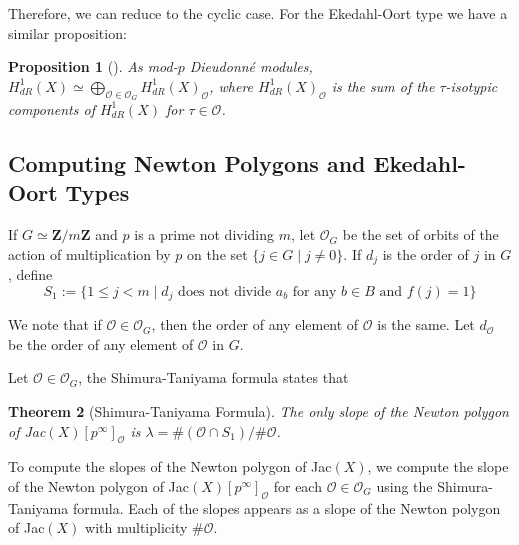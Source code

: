 \documentclass{article}
\newtheorem{theorem}{Theorem}[section]
\newtheorem{proposition}[theorem]{Proposition}
\theoremstyle{remark}
\theoremstyle{definition}
\begin{document}
\par Therefore, we can reduce to the cyclic case. For the Ekedahl-Oort type we have a similar proposition:
\begin{proposition}
    [] As mod-$p$ Dieudonn\'{e} modules, $H^1_{dR}(X) \simeq \bigoplus_{\mathcal{O} \in \mathcal{O}_G} H^1_{dR}(X)_{\mathcal{O}}$, where $H^1_{dR}(X)_{\mathcal{O}}$ is the sum of the $\tau$-isotypic components of $H^1_{dR}(X)$ for $\tau \in \mathcal{O}$.
\end{proposition} 


\subsection{Computing Newton Polygons and Ekedahl-Oort Types}
\par If $G \simeq \mathbf{Z}/m\mathbf{Z}$ and $p$ is a prime not dividing $m$, let $\mathcal{O}_G$ be the set of orbits of the action of multiplication by $p$ on the set $\{j \in G \mid j \neq 0\}$. If $d_j$ is the order of $j$ in $G$, define \[S_1 := \{1 \leq j < m \mid d_j \textrm{ does not divide } a_b \textrm{ for any } b \in B \textrm{ and } f(j)=1\}\]
\par We note that if $\mathcal{O} \in \mathcal{O}_G$, then the order of any element of $\mathcal{O}$ is the same. Let $d_\mathcal{O}$ be the order of any element of $\mathcal{O}$ in $G$.
\par Let $\mathcal{O} \in \mathcal{O}_G$, the Shimura-Taniyama formula  states that 

\begin{theorem}[Shimura-Taniyama Formula]
    \cite[Section 5]{SB_1968-1969__11__95_0} The only slope of the Newton polygon of Jac$(X)[p^\infty]_\mathcal{O}$ is $\lambda = \#(\mathcal{O} \cap S_1)/\#\mathcal{O}$.
\end{theorem}
\par To compute the slopes of the Newton polygon of Jac$(X)$, we compute the slope of the Newton polygon of Jac$(X)[p^\infty]_\mathcal{O}$ for each $\mathcal{O} \in \mathcal{O}_G$ using the Shimura-Taniyama formula. Each of the slopes appears as a slope of the Newton polygon of Jac$(X)$ with multiplicity $\#\mathcal{O}$. 
\end{document}

